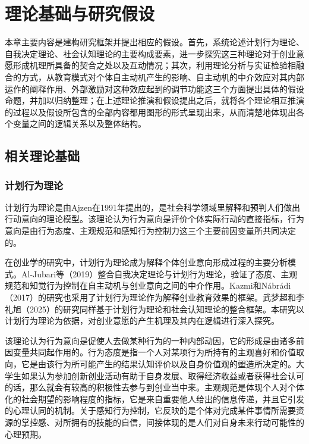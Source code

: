 \chapter{理论基础与研究假设}

本章主要内容是建构研究框架并提出相应的假设。首先，系统论述计划行为理论、自我决定理论、社会认知理论的主要构成要素，进一步探究这三种理论对于创业意愿形成机理所具备的契合之处以及互动情况；其次，利用理论分析与实证检验相融合的方式，从教育模式对个体自主动机产生的影响、自主动机的中介效应对其内部运作的阐释作用、外部激励对这种效应起到的调节功能这三个方面提出具体的假设命题，并加以归纳整理；在上述理论推演和假设提出之后，就将各个理论相互推演的过程以及假设所包含的全部内容都用图形的形式呈现出来，从而清楚地体现出各个变量之间的逻辑关系以及整体结构。

\section{相关理论基础}

\subsection{计划行为理论}

计划行为理论是由Ajzen在1991年提出的，是社会科学领域里解释和预判人们做出行动意向的理论模型\cite{Ajzen1991}。该理论认为行为意向是评价个体实际行动的直接指标，行为意向是由行为态度、主观规范和感知行为控制力这三个主要前因变量所共同决定的。

在创业学的研究中，计划行为理论成为解释个体创业意向形成过程的主要分析模式。Al-Jubari等\nolinebreak[3]（2019）整合自我决定理论与计划行为理论，验证了态度、主观规范和知觉行为控制在自主动机与创业意向之间的中介作用\cite{AlJubari2019}。Kazmi和Nábrádi\nolinebreak[3]（2017）的研究也采用了计划行为理论作为解释创业教育效果的框架\cite{Kazmi2017}。武梦超和李礼旭\nolinebreak[3]（2025）的研究同样基于计划行为理论和社会认知理论的整合框架\cite{wumengchao2025}。本研究以计划行为理论为依据，对创业意愿的产生机理及其内在逻辑进行深入探究。

该理论认为行为意向是促使人去做某种行为的一种内部动因，它的形成是由诸多前因变量共同起作用的。行为态度是指一个人对某项行为所持有的主观喜好和价值取向，它是由该行为所可能产生的结果认知评价以及自身价值观的塑造所决定的。大学生如果认为参加创新创业活动有助于自身发展、取得经济收益或者获得社会认可的话，那么就会有较高的积极性去参与到创业当中来。主观规范是体现个人对个体化的社会期望的影响程度的指标，它是来自重要他人给出的信息传递，并且它引发的心理认同的机制。关于感知行为控制，它反映的是个体对完成某件事情所需要资源的掌控感、对所拥有的技能的自信，间接体现的是人们对自身未来行动可能性的心理预期。


